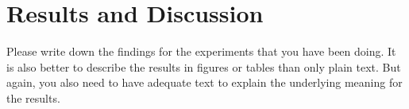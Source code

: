\chapter{Results and Discussion}
\label{cp:results_discussion}

Please write down the findings for the experiments that you have been doing. It is also better to describe the results in figures or tables than only plain text. But again, you also need to have adequate text to explain the underlying meaning for the results.